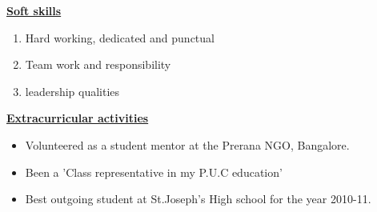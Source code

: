 \documentclass[10pt]{article}
\begin{document}
			\underline{\textbf{\Large{Soft skills}}}
			\begin{enumerate}
				\item{Hard working, dedicated and punctual}
				\item{Team work and responsibility}
				\item{leadership qualities} 
				
			\end{enumerate}
			
			\hfill
			
		\underline{\textbf{\Large{Extracurricular activities}}}
		\begin{itemize}
			\item{Volunteered as a student mentor at the Prerana NGO, Bangalore.}
			\item{Been a 'Class representative in my P.U.C education'}
			\item{Best outgoing student at St.Joseph's High school for the year 2010-11.}
			
		\end{itemize}
		
		\hfill
	
\end{document}
